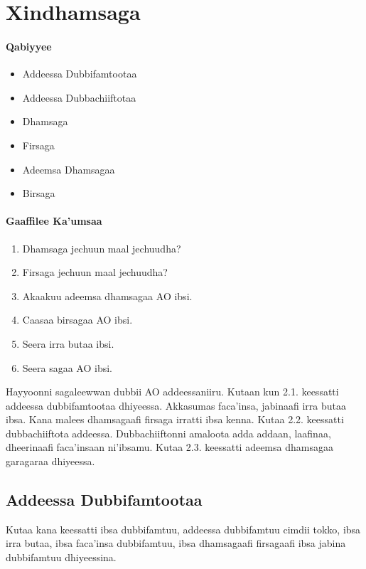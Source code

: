 \documentclass[11pt,b5paper]{book}
\begin{document}
\chapter{Xindhamsaga}
\setlength{\parindent}{3em}
\subsubsection{Qabiyyee}

\begin{itemize}
  \item Addeessa Dubbifamtootaa
  \item Addeessa Dubbachiiftotaa
  \item Dhamsaga
  \item Firsaga
  \item Adeemsa Dhamsagaa
  \item Birsaga
\end{itemize}
\subsubsection{Gaaffilee Ka'umsaa}
\begin{enumerate}
	\item Dhamsaga jechuun maal jechuudha?
	\item Firsaga jechuun maal jechuudha?
	\item Akaakuu adeemsa dhamsagaa AO ibsi.
	\item Caasaa birsagaa AO ibsi.
	\item Seera irra butaa ibsi.
	\item Seera sagaa AO ibsi.
\end{enumerate}

Hayyoonni sagaleewwan dubbii AO addeessaniiru\cite{griefenow2001grammatical,owens1985grammar,wako1981}. Kutaan kun 2.1.  keessatti addeessa dubbifamtootaa dhiyeessa. Akkasumas  faca’insa, jabinaafi irra butaa ibsa. Kana malees dhamsagaafi  firsaga irratti ibsa kenna. Kutaa 2.2. keessatti dubbachiiftota  addeessa. Dubbachiiftonni amaloota adda addaan, laafinaa,
dheerinaafi faca’insaan ni’ibsamu. Kutaa 2.3. keessatti  adeemsa dhamsagaa garagaraa dhiyeessa.
\section{Addeessa Dubbifamtootaa}

Kutaa kana keessatti ibsa dubbifamtuu, addeessa dubbifamtuu  cimdii tokko, ibsa irra butaa, ibsa faca’insa dubbifamtuu, ibsa  dhamsagaafi firsagaafi ibsa jabina dubbifamtuu dhiyeessina.
\end{document}
